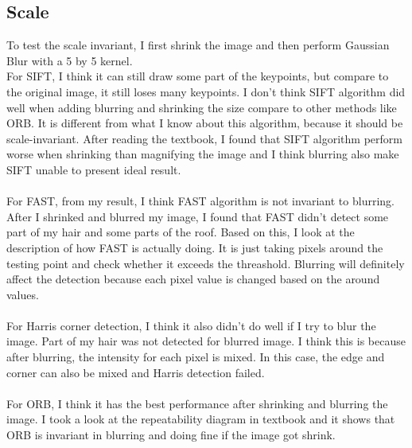 \documentclass{article}
\begin{document}
\subsection*{Scale}
To test the scale invariant, I first shrink the image and then perform Gaussian Blur with a 5 by 5 kernel.\\
For SIFT, I think it can still draw some part of the keypoints, but compare to the original image, it still loses many keypoints.
I don't think SIFT algorithm did well when adding blurring and shrinking the size compare to other methods like ORB.
It is different from what I know about this algorithm, because it should be scale-invariant.
After reading the textbook, I found that SIFT algorithm perform worse when shrinking than magnifying the image and I think blurring also make SIFT unable to present ideal result.\\
\\
For FAST, from my result, I think FAST algorithm is not invariant to blurring.
After I shrinked and blurred my image, I found that FAST didn't detect some part of my hair and some parts of the roof.
Based on this, I look at the description of how FAST is actually doing.
It is just taking pixels around the testing point and check whether it exceeds the threashold. 
Blurring will definitely affect the detection because each pixel value is changed based on the around values.\\
\\
For Harris corner detection, I think it also didn't do well if I try to blur the image.
Part of my hair was not detected for blurred image.
I think this is because after blurring, the intensity for each pixel is mixed.
In this case, the edge and corner can also be mixed and Harris detection failed.\\
\\
For ORB, I think it has the best performance after shrinking and blurring the image.
I took a look at the repeatability diagram in textbook and it shows that ORB is invariant in blurring and doing fine if the image got shrink.
\end{document}
